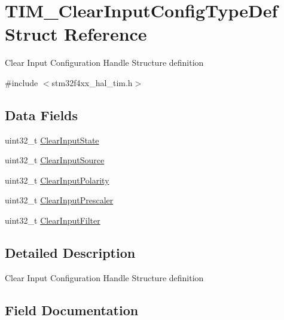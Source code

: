 \hypertarget{struct_t_i_m___clear_input_config_type_def}{}\section{T\+I\+M\+\_\+\+Clear\+Input\+Config\+Type\+Def Struct Reference}
\label{struct_t_i_m___clear_input_config_type_def}


Clear Input Configuration Handle Structure definition ~\newline
  




{\ttfamily \#include $<$stm32f4xx\+\_\+hal\+\_\+tim.\+h$>$}

\subsection*{Data Fields}
\begin{DoxyCompactItemize}
\item 
uint32\+\_\+t \mbox{\hyperlink{struct_t_i_m___clear_input_config_type_def_ae375822fd9a07ebafaf13fc47db211db}{Clear\+Input\+State}}
\item 
uint32\+\_\+t \mbox{\hyperlink{struct_t_i_m___clear_input_config_type_def_a53908db365bf0aa50a9217dcee98b61c}{Clear\+Input\+Source}}
\item 
uint32\+\_\+t \mbox{\hyperlink{struct_t_i_m___clear_input_config_type_def_a952f89c595fc06fe7e0ad41f8992fda2}{Clear\+Input\+Polarity}}
\item 
uint32\+\_\+t \mbox{\hyperlink{struct_t_i_m___clear_input_config_type_def_a177e485feed1a56dbb578aa11f758c79}{Clear\+Input\+Prescaler}}
\item 
uint32\+\_\+t \mbox{\hyperlink{struct_t_i_m___clear_input_config_type_def_a79dfd4545a2fa8ca202bf0e80374db66}{Clear\+Input\+Filter}}
\end{DoxyCompactItemize}


\subsection{Detailed Description}
Clear Input Configuration Handle Structure definition ~\newline
 

\subsection{Field Documentation}
\mbox{\label{struct_t_i_m___clear_input_config_type_def_a79dfd4545a2fa8ca202bf0e80374db66}} 
